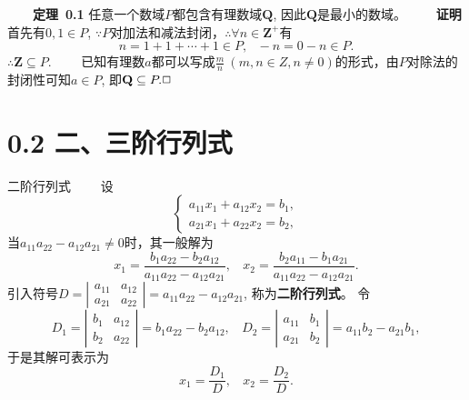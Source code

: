 \documentclass[compress,mathserif,cjk]{beamer}
\theoremstyle{remark}
\numberwithin{equation}{section}
\newcommand{\hei}{\bf}      %
\begin{document}
\begin{CJK}{UTF8}{gbsn}
\begin{frame}

 \ \ \ \ {\hei 定理~0.1} 任意一个数域$P$都包含有理数域$\mathbf Q$, 因此$\mathbf Q$是最小的数域。
 \pause\vskip10pt
  \ \ \ \ {\hei 证明} 首先有$0,1\in P$, $\because P$对加法和减法封闭，$\therefore\forall n\in\mathbf Z^+$有
  $$n=1+1+\cdots+1\in P,~~~-n=0-n\in P.$$
  $\therefore\mathbf Z\subseteq P$.
  \pause\vskip5pt
  \ \ \ \ 已知有理数$a$都可以写成$\frac{m}n~(m,n\in Z,n\neq0)$的形式，由$P$对除法的封闭性可知$a\in P$, 即$\mathbf Q\subseteq P.\hfill\Box$
\end{frame}

\section[0.2]{0.2 二、三阶行列式}

\begin{frame}{二阶行列式}
 \ \ \ \ 设
 $$\left\{\begin{array}{l}
 a_{11}x_1+a_{12}x_2=b_1,\\
 a_{21}x_1+a_{22}x_2=b_2,
 \end{array}\right.$$
 当$a_{11}a_{22}-a_{12}a_{21}\neq0$时，其一般解为
 $$x_1=\frac{b_1a_{22}-b_2a_{12}}{a_{11}a_{22}-a_{12}a_{21}},~~~~x_2=\frac{b_2a_{11}-b_1a_{21}}{a_{11}a_{22}-a_{12}a_{21}}.$$
 \pause
  引入符号$D=\left|\begin{matrix}a_{11}&a_{12}\\a_{21}&a_{22}\end{matrix}\right|=a_{11}a_{22}-a_{12}a_{21}$, 称为{\hei 二阶行列式}。 \pause 令
  $$D_1=\left|\begin{matrix}b_1&a_{12}\\b_2&a_{22}\end{matrix}\right|=b_1a_{22}-b_2a_{12},~~~~D_2=\left|\begin{matrix}a_{11}&b_1\\a_{21}&b_2\end{matrix}\right|=a_{11}b_2-a_{21}b_1,$$
  于是其解可表示为
  $$x_1=\frac{D_1}D,~~~~x_2=\frac{D_2}D.$$
\end{frame}


\end{CJK}
\end{document}
